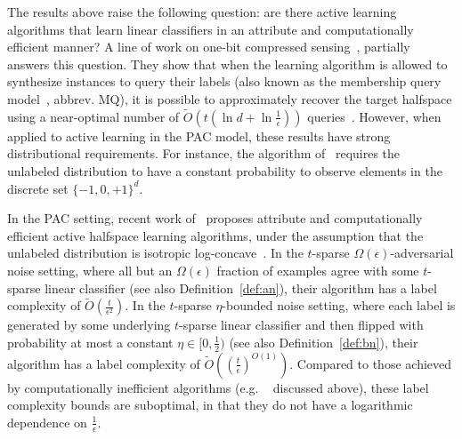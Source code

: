 The results above raise the following question: are there active learning algorithms that learn linear classifiers in an attribute and computationally efficient manner?
A line of work on one-bit compressed sensing~\citep{BB08}, partially answers this question. They show that when the learning algorithm is allowed to synthesize instances to query their labels (also known as the membership query model~\citep{A88}, abbrev. MQ), it is possible to approximately recover the target halfspace using a near-optimal number of $\tilde{O}(t (\ln d + \ln \frac 1 \epsilon))$ queries~\citep{HB11}.
However, when applied to active learning in the PAC model, these results have strong distributional
requirements.
For instance, the algorithm of~\cite{HB11} requires the unlabeled distribution to have a constant probability to observe elements in the discrete set $\{-1,0,+1\}^d$.

In the PAC setting, recent work of~\cite{ABHZ16} proposes attribute and computationally efficient active halfspace learning algorithms, under the assumption that the unlabeled distribution is isotropic log-concave~\citep{LV07}. In the $t$-sparse $\Omega(\epsilon)$-adversarial noise setting, where all but an $\Omega(\epsilon)$ fraction of examples agree with some $t$-sparse linear classifier (see also Definition~\ref{def:an}), their algorithm has a label complexity of $\tilde{O}(\frac{t}{\epsilon^2} )$.
In the $t$-sparse $\eta$-bounded noise setting, where each label is generated by some underlying $t$-sparse linear classifier and then flipped with probability at most a constant $\eta \in [0,\frac12)$ (see also Definition~\ref{def:bn}), their algorithm has a label complexity of $\tilde{O}((\frac{t}{\epsilon})^{O(1)} )$. Compared to those achieved by computationally inefficient algorithms (e.g. ~\cite{ZC14} discussed above), these label complexity bounds are suboptimal, in that they do not have a logarithmic dependence on $\frac 1 \epsilon$.

